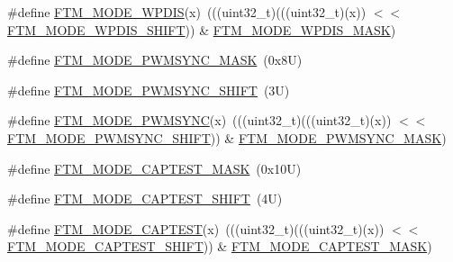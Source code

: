 \begin{DoxyCompactItemize}
\item 
\#define \mbox{\hyperlink{group___f_t_m___register___masks_ga89ad39cf15c00197e31e5c3d695fcecc}{F\+T\+M\+\_\+\+M\+O\+D\+E\+\_\+\+W\+P\+D\+IS}}(x)~(((uint32\+\_\+t)(((uint32\+\_\+t)(x)) $<$$<$ \mbox{\hyperlink{group___f_t_m___register___masks_ga36fb0f391d4b52f38caf711ba8d73ae7}{F\+T\+M\+\_\+\+M\+O\+D\+E\+\_\+\+W\+P\+D\+I\+S\+\_\+\+S\+H\+I\+FT}})) \& \mbox{\hyperlink{group___f_t_m___register___masks_ga1178ceaccafa6eb9f10395901c75f7ba}{F\+T\+M\+\_\+\+M\+O\+D\+E\+\_\+\+W\+P\+D\+I\+S\+\_\+\+M\+A\+SK}})
\item 
\#define \mbox{\hyperlink{group___f_t_m___register___masks_ga3993337287da1b6624d5f7d70f10b3d5}{F\+T\+M\+\_\+\+M\+O\+D\+E\+\_\+\+P\+W\+M\+S\+Y\+N\+C\+\_\+\+M\+A\+SK}}~(0x8\+U)
\item 
\#define \mbox{\hyperlink{group___f_t_m___register___masks_ga5e9f1c44632b559046173b3b0db93170}{F\+T\+M\+\_\+\+M\+O\+D\+E\+\_\+\+P\+W\+M\+S\+Y\+N\+C\+\_\+\+S\+H\+I\+FT}}~(3\+U)
\item 
\#define \mbox{\hyperlink{group___f_t_m___register___masks_ga7979eeb69e6f705a7a74d874e74d474c}{F\+T\+M\+\_\+\+M\+O\+D\+E\+\_\+\+P\+W\+M\+S\+Y\+NC}}(x)~(((uint32\+\_\+t)(((uint32\+\_\+t)(x)) $<$$<$ \mbox{\hyperlink{group___f_t_m___register___masks_ga5e9f1c44632b559046173b3b0db93170}{F\+T\+M\+\_\+\+M\+O\+D\+E\+\_\+\+P\+W\+M\+S\+Y\+N\+C\+\_\+\+S\+H\+I\+FT}})) \& \mbox{\hyperlink{group___f_t_m___register___masks_ga3993337287da1b6624d5f7d70f10b3d5}{F\+T\+M\+\_\+\+M\+O\+D\+E\+\_\+\+P\+W\+M\+S\+Y\+N\+C\+\_\+\+M\+A\+SK}})
\item 
\#define \mbox{\hyperlink{group___f_t_m___register___masks_ga24f1ea5d7afd4ec88404e4867303aae5}{F\+T\+M\+\_\+\+M\+O\+D\+E\+\_\+\+C\+A\+P\+T\+E\+S\+T\+\_\+\+M\+A\+SK}}~(0x10\+U)
\item 
\#define \mbox{\hyperlink{group___f_t_m___register___masks_gab95eb2088da81d610805b949399d9bf9}{F\+T\+M\+\_\+\+M\+O\+D\+E\+\_\+\+C\+A\+P\+T\+E\+S\+T\+\_\+\+S\+H\+I\+FT}}~(4\+U)
\item 
\#define \mbox{\hyperlink{group___f_t_m___register___masks_gae1781c120c7860ed6187aec8edc7dc9f}{F\+T\+M\+\_\+\+M\+O\+D\+E\+\_\+\+C\+A\+P\+T\+E\+ST}}(x)~(((uint32\+\_\+t)(((uint32\+\_\+t)(x)) $<$$<$ \mbox{\hyperlink{group___f_t_m___register___masks_gab95eb2088da81d610805b949399d9bf9}{F\+T\+M\+\_\+\+M\+O\+D\+E\+\_\+\+C\+A\+P\+T\+E\+S\+T\+\_\+\+S\+H\+I\+FT}})) \& \mbox{\hyperlink{group___f_t_m___register___masks_ga24f1ea5d7afd4ec88404e4867303aae5}{F\+T\+M\+\_\+\+M\+O\+D\+E\+\_\+\+C\+A\+P\+T\+E\+S\+T\+\_\+\+M\+A\+SK}})
\item 
$$
\end{DoxyCompactItemize}
